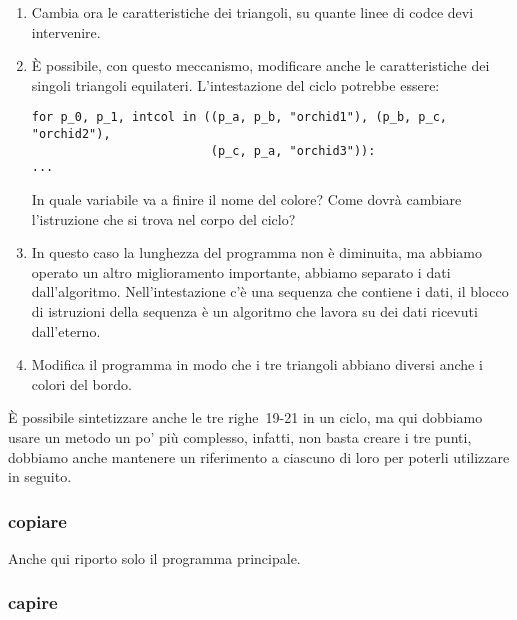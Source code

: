 \begin{enumerate} [noitemsep]
 \item Cambia ora le caratteristiche dei triangoli, su quante linee di codce 
devi intervenire.
 \item È possibile, con questo meccanismo, modificare anche le caratteristiche 
dei singoli triangoli equilateri. L'intestazione del ciclo potrebbe essere:
\begin{lstlisting}[firstnumber=22]
for p_0, p_1, intcol in ((p_a, p_b, "orchid1"), (p_b, p_c, "orchid2"),
                         (p_c, p_a, "orchid3")): 
...
\end{lstlisting}
In quale variabile va a finire il nome del colore? Come dovrà cambiare 
l'istruzione che si trova nel corpo del ciclo?
 \item In questo caso la lunghezza del programma non è diminuita, ma abbiamo 
operato un altro miglioramento importante, abbiamo separato i dati 
dall'algoritmo. Nell'intestazione c'è una sequenza che contiene i dati, il 
blocco di istruzioni della sequenza è un algoritmo che lavora su dei dati 
ricevuti dall'eterno.
 \item Modifica il programma in modo che i tre triangoli abbiano diversi anche 
i colori del bordo.
\end{enumerate}

È possibile sintetizzare anche le tre righe~19-21 in un ciclo, ma qui dobbiamo 
usare un metodo un po' più complesso, infatti, non basta creare i tre punti, 
dobbiamo anche mantenere un riferimento a ciascuno di loro per poterli 
utilizzare in seguito.

\subsubsection{copiare}

Anche qui riporto solo il programma principale.



\subsubsection{capire}

